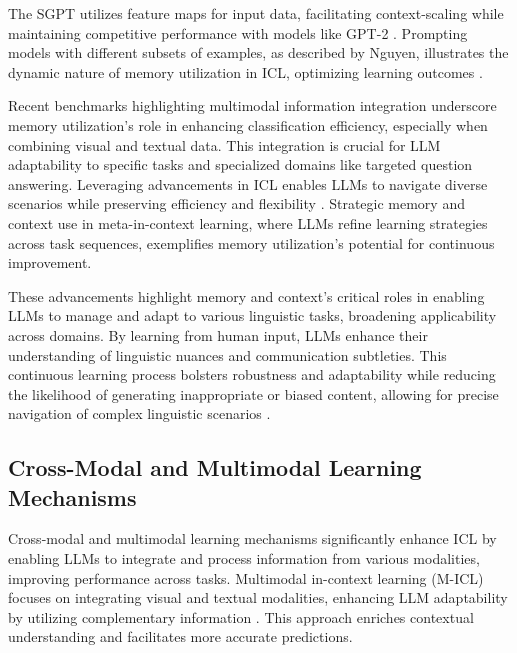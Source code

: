 The SGPT utilizes feature maps for input data, facilitating context-scaling while maintaining competitive performance with models like GPT-2 \cite{abedsoltan2024contextscalingversustaskscalingincontext}. Prompting models with different subsets of examples, as described by Nguyen, illustrates the dynamic nature of memory utilization in ICL, optimizing learning outcomes \cite{nguyen2023incontextexampleselectioninfluences}.

Recent benchmarks highlighting multimodal information integration underscore memory utilization's role in enhancing classification efficiency, especially when combining visual and textual data. This integration is crucial for LLM adaptability to specific tasks and specialized domains like targeted question answering. Leveraging advancements in ICL enables LLMs to navigate diverse scenarios while preserving efficiency and flexibility \cite{wang2024elicitllmaugmentationexternal,mojarradi2024improvingincontextlearningsmall}. Strategic memory and context use in meta-in-context learning, where LLMs refine learning strategies across task sequences, exemplifies memory utilization's potential for continuous improvement.

These advancements highlight memory and context's critical roles in enabling LLMs to manage and adapt to various linguistic tasks, broadening applicability across domains. By learning from human input, LLMs enhance their understanding of linguistic nuances and communication subtleties. This continuous learning process bolsters robustness and adaptability while reducing the likelihood of generating inappropriate or biased content, allowing for precise navigation of complex linguistic scenarios \cite{parry2024incontextlearningori,moradi2024exploringlandscapelargelanguage,he2024usingnaturallanguageexplanations}.

\subsection{Cross-Modal and Multimodal Learning Mechanisms} \label{subsec:Cross-Modal and Multimodal Learning Mechanisms}

Cross-modal and multimodal learning mechanisms significantly enhance ICL by enabling LLMs to integrate and process information from various modalities, improving performance across tasks. Multimodal in-context learning (M-ICL) focuses on integrating visual and textual modalities, enhancing LLM adaptability by utilizing complementary information \cite{luo2024doestextualinformationaffect}. This approach enriches contextual understanding and facilitates more accurate predictions.

